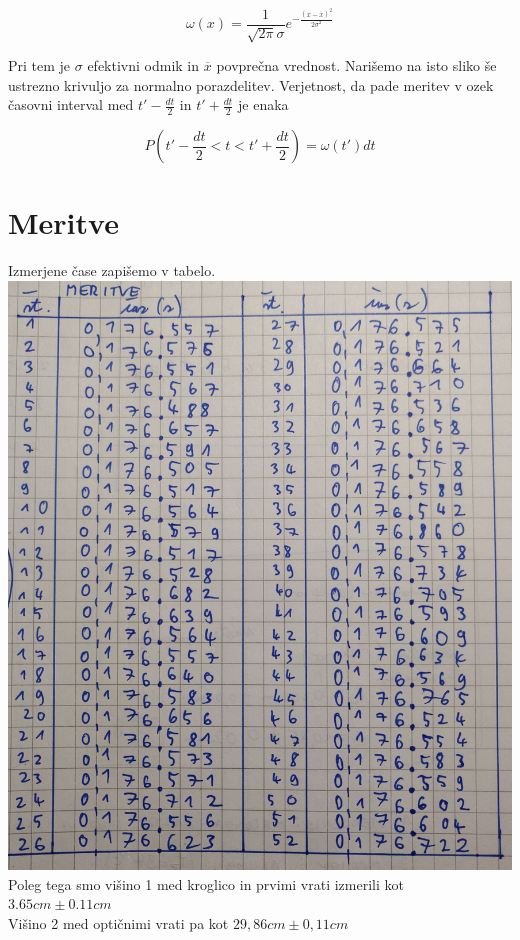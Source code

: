 \documentclass[a4paper]{report}
\begin{document}
\[\omega(x)=\frac{1}{\sqrt{2\pi}\sigma}e^{-\frac{(x-\overline{x})^2}{2\sigma^2}}\]

Pri tem je $\sigma$ efektivni odmik in $\overline{x}$ povprečna vrednost. Narišemo na isto sliko še ustrezno krivuljo za normalno porazdelitev. Verjetnost, da pade meritev v ozek časovni interval med $t'-\frac{dt}{2}$ in $t'+\frac{dt}{2}$ je enaka

\[P\left(t'-\frac{dt}{2}<t<t'+\frac{dt}{2}\right) =\omega(t')dt\]
\pagebreak
\chapter*{Meritve}
Izmerjene čase zapišemo v tabelo.\\

\includegraphics[width=\textwidth]{Tabela meritev}
Poleg tega smo višino 1 med kroglico in prvimi vrati izmerili kot $3.65cm\pm0.11cm$\\
Višino 2 med optičnimi vrati pa kot $29,86cm\pm0,11cm$
\pagebreak
\end{document}

